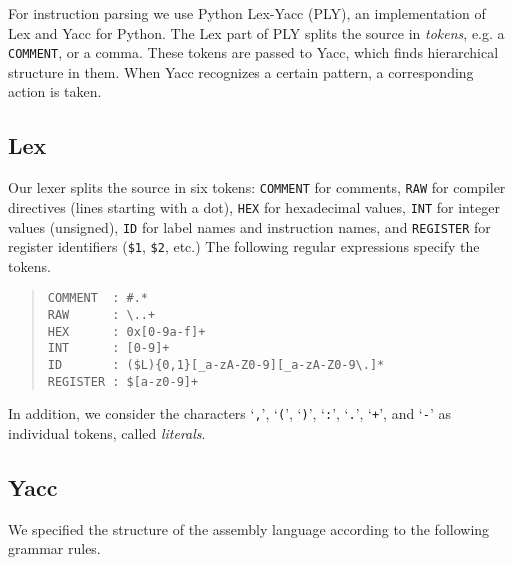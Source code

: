 For instruction parsing we use Python Lex-Yacc (PLY), an implementation of Lex and Yacc for Python. The Lex part of PLY splits the source in \emph{tokens}, e.g. a \verb!COMMENT!, or a comma. These tokens are passed to Yacc, which finds hierarchical structure in them. When Yacc recognizes a certain pattern, a corresponding action is taken.

\subsection{Lex}

Our lexer splits the source in six tokens: \verb!COMMENT! for comments, \verb!RAW! for compiler directives (lines starting with a dot), \verb!HEX! for hexadecimal values, \verb!INT! for integer values (unsigned), \verb!ID! for label names and instruction names, and \verb!REGISTER! for register identifiers (\verb!$1!, \verb!$2!, etc.)
The following regular expressions specify the tokens.
\begin{quote}
\begin{verbatim}
COMMENT  : #.*
RAW      : \..+
HEX      : 0x[0-9a-f]+
INT      : [0-9]+
ID       : ($L){0,1}[_a-zA-Z0-9][_a-zA-Z0-9\.]*
REGISTER : $[a-z0-9]+
\end{verbatim}
\end{quote}
In addition, we consider the characters `\verb!,!', `\verb!(!', `\verb!)!', `\verb!:!', `\verb!.!', `\verb!+!', and `\verb!-!' as individual tokens, called \emph{literals}.

\subsection{Yacc}
We specified the structure of the assembly language according to the following grammar rules.

